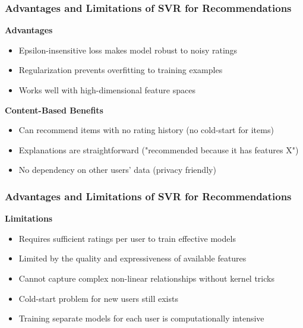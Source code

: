 \documentclass{beamer}
\begin{document}
\begin{frame}
\frametitle{Advantages and Limitations of SVR for Recommendations}
    \textbf{Advantages}
    \begin{itemize}
        \item Epsilon-insensitive loss makes model robust to noisy ratings
        \item Regularization prevents overfitting to training examples
        \item Works well with high-dimensional feature spaces
    \end{itemize}

    \vspace{1cm}
    
    \textbf{Content-Based Benefits}
    \begin{itemize}
        \item Can recommend items with no rating history (no cold-start for items)
        \item Explanations are straightforward ("recommended because it has features X")
        \item No dependency on other users' data (privacy friendly)
    \end{itemize}
\end{frame}

\begin{frame}
\frametitle{Advantages and Limitations of SVR for Recommendations}
    \textbf{Limitations}
    \begin{itemize}
        \item Requires sufficient ratings per user to train effective models
        \item Limited by the quality and expressiveness of available features
        \item Cannot capture complex non-linear relationships without kernel tricks
        \item Cold-start problem for new users still exists
        \item Training separate models for each user is computationally intensive
    \end{itemize}
\end{frame}
\end{document}
